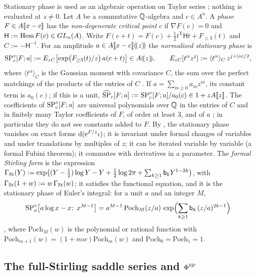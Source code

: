 Stationary phase is used as an algebraic operation on Taylor series ; nothing is evaluated at $z\neq0$. Let $A$ be a commutative $\mathbb{Q}$-algebra and $c\in A^n$. A \emph{phase} $F\in A[\![ x-c ]\!]$ has the \emph{non-degenerate critical point} $c$ if $\nabla F(c)=0$ and $\mathsf H:=\operatorname{Hess} F(c)\in GL_n(A)$. Write $F(c+t)=F(c)+\frac12t^{\mathrm T}\mathsf Ht+F_{\geq3}(t)$ and $C:=-\mathsf H^{-1}$. For an amplitude $a\in A[\![ x-c ]\!](\!(z)\!)$ the \emph{normalised stationary phase} is
\[
\mathrm{SP}^{\circ}_c[F;a]:=E_{zC}\bigl[\exp\bigl(F_{\geq3}(t)/z\bigr)\,a(c+t)\bigr]\in A(\!(z)\!),\qquad E_{zC}[t^\alpha z^j]:=\langle t^\alpha\rangle_C\,z^{j+|\alpha|/2},
\]
where $\langle t^\alpha\rangle_C$ is the Gaussian moment with covariance $C$, the sum over the perfect matchings of the products of the entries of $C$ . If $a=\sum_{m\geq0}a_mz^m$, its constant term is $a_0(c)$; if this is a unit, $\widehat{\mathrm{SP}}_c[F;a]:=\mathrm{SP}^{\circ}_c[F;a]/a_0(c)\in1+zA[\![ z ]\!]$.  The coefficients of $\mathrm{SP}^{\circ}_c[F;a]$ are universal polynomials over $\mathbb{Q}$ in the entries of $C$ and in finitely many Taylor coefficients of $F$, of order at least $3$, and of $a$ ; in particular they do not see constants added to $F$. By , the stationary phase vanishes on exact forms $\mathrm{d}(\mathrm{e}^{F/z}\iota)$; it is invariant under formal changes of variables and under translations by multiples of $z$; it can be iterated variable by variable (a formal Fubini theorem); it commutes with derivatives in a parameter. The \emph{formal Stirling form} is the expression $\Gamma_{\mathrm{St}}(Y):=\exp\bigl((Y-\frac12)\log Y-Y+\frac12\log2\pi+\sum_{k\geq1}\mathsf{b}_kY^{1-2k}\bigr)$, with $\Gamma_{\mathrm{St}}(1+w):=w\,\Gamma_{\mathrm{St}}(w)$; it satisfies the functional equation, and it is the stationary phase of Euler's integral: for a unit $a$ and an integer $M$,
\[
\SPn_a\bigl[a\log x-x;\ x^{M-1}\bigr]=a^{M-1}\,\mathrm{Poch}_M(z/a)\,\exp\Bigl(\sum_{k\geq1}\bk_k\,(z/a)^{2k-1}\Bigr)
\]
, where $\mathrm{Poch}_M(w)$ is the polynomial or rational function with $\mathrm{Poch}_{m+1}(w)=(1+mw)\mathrm{Poch}_m(w)$ and $\mathrm{Poch}_0=\mathrm{Poch}_1=1$.

\subsection{The full-Stirling saddle series and \texorpdfstring{$\Phi^{\mathrm{SP}}$}{the full-Stirling WKB function}}
\label{sec:con-form}

